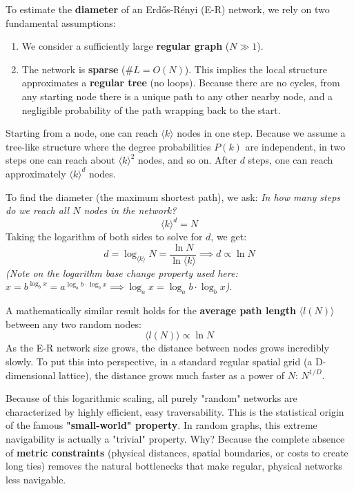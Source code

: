 To estimate the \textbf{diameter} of an Erdős-Rényi (E-R) network, we rely on two fundamental assumptions:
\begin{enumerate}
    \item We consider a sufficiently large \textbf{regular graph} ($N \gg 1$).
    \item The network is \textbf{sparse} ($\#L = O(N)$). This implies the local structure approximates a \textbf{regular tree} (no loops). Because there are no cycles, from any starting node there is a unique path to any other nearby node, and a negligible probability of the path wrapping back to the start.
\end{enumerate}

Starting from a node, one can reach $\langle k \rangle$ nodes in one step. Because we assume a tree-like structure where the degree probabilities $P(k)$ are independent, in two steps one can reach about $\langle k \rangle^2$ nodes, and so on.
After $d$ steps, one can reach approximately $\langle k \rangle^d$ nodes.

To find the diameter (the maximum shortest path), we ask: \textit{In how many steps do we reach all $N$ nodes in the network?}
\[
    \langle k \rangle^d = N
\]
Taking the logarithm of both sides to solve for $d$, we get:
\[
    d = \log_{\langle k \rangle} N = \frac{\ln N}{\ln \langle k \rangle} \implies d \propto \ln N
\]
\textit{(Note on the logarithm base change property used here: $x = b^{\log_b x} = a^{\log_a b \cdot \log_b x} \implies \log_a x = \log_a b \cdot \log_b x$)}.

A mathematically similar result holds for the \textbf{average path length} $\langle l(N) \rangle$ between any two random nodes:
\[
    \langle l(N) \rangle \propto \ln N
\]
As the E-R network size grows, the distance between nodes grows incredibly slowly. To put this into perspective, in a standard regular spatial grid (a D-dimensional lattice), the distance grows much faster as a power of $N$: $N^{1/D}$.

Because of this logarithmic scaling, all purely "random" networks are characterized by highly efficient, easy traversability. This is the statistical origin of the famous \textbf{"small-world" property}. In random graphs, this extreme navigability is actually a "trivial" property. Why? Because the complete absence of \textbf{metric constraints} (physical distances, spatial boundaries, or costs to create long ties) removes the natural bottlenecks that make regular, physical networks less navigable.

